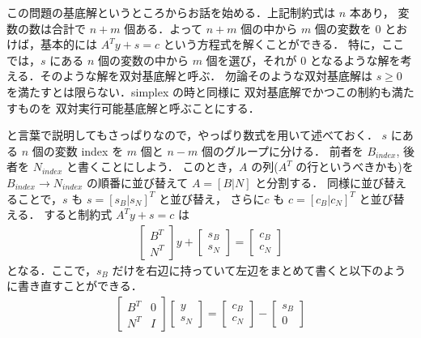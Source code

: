 \documentclass[11pt, a4]{article}
\begin{document}
この問題の基底解というところからお話を始める．上記制約式は $n$ 本あり，
変数の数は合計で $n + m$ 個ある．よって $n + m$ 個の中から
$m$ 個の変数を $0$ とおけば，基本的には $A^Ty + s  = c$ という方程式を解くことができる．
特に，ここでは，$s$ にある $n$ 個の変数の中から $m$ 個を選び，それが $0$ となるような解を考える．そのような解を双対基底解と呼ぶ．
勿論そのような双対基底解は $s \geq 0$ を満たすとは限らない．simplex の時と同様に
双対基底解でかつこの制約も満たすものを
双対実行可能基底解と呼ぶことにする．

と言葉で説明してもさっぱりなので，やっぱり数式を用いて述べておく．
$s$ にある $n$ 個の変数 index を $m$ 個と $n - m$ 個のグループに分ける．
前者を $B_{index}$, 後者を $N_{index}$ と書くことにしよう．
このとき，$A$ の列($A^T$ の行というべきかも)を $B_{index}\rightarrow N_{index}$
の順番に並び替えて $A = [B|N]$ と分割する．
同様に並び替えることで，$s$ も $s = [s_B|s_N]^T$ と並び替え，
さらに$c$ も $c = [c_B|c_N]^T$ と並び替える．
すると制約式 $A^T y + s = c$ は
\begin{eqnarray}
  \left[
    \begin{array}{c}
      B^T\nonumber\\
      \hline
      N^T
    \end{array}
    \right]y +
  \left[
    \begin{array}{c}
      s_B\nonumber\\
      \hline
      s_N
    \end{array}
    \right] =
  \left[
    \begin{array}{c}
      c_B\nonumber\\
      \hline
      c_N
    \end{array}
    \right]  
\end{eqnarray}
となる．ここで，$s_B$ だけを右辺に持っていて左辺をまとめて書くと以下のように書き直すことができる．
\begin{eqnarray}
  \left[
    \begin{array}{c|c}
      B^T&0\nonumber\\
      \hline
      N^T&I
    \end{array}
    \right]
  \left[
    \begin{array}{c}
      y\nonumber\\
      \hline
      s_N
    \end{array}
    \right]  
  =
  \left[
    \begin{array}{c}
      c_B\nonumber\\
      \hline
      c_N
    \end{array}
    \right] -
    \left[
    \begin{array}{c}
      s_B\nonumber\\
      \hline
      0
    \end{array}
    \right]
\end{eqnarray}
\end{document}
